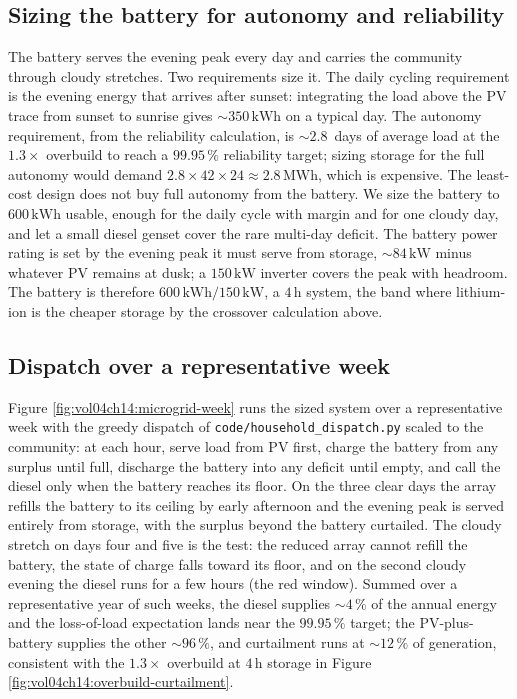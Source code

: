 \subsection{Sizing the battery for autonomy and reliability}

The battery serves the evening peak every day and carries the community
through cloudy stretches. Two requirements size it. The daily cycling
requirement is the evening energy that arrives after sunset: integrating
the load above the PV trace from sunset to sunrise gives $\sim
350\,\si{\kilo\watt\hour}$ on a typical day. The autonomy requirement,
from the reliability calculation, is $\sim 2.8\,$ days of average load at
the $1.3\times$ overbuild to reach a $99.95\,\%$ reliability target;
sizing storage for the full autonomy would demand $2.8\times 42\times 24
\approx 2.8\,\si{\mega\watt\hour}$, which is expensive. The least-cost
design does not buy full autonomy from the battery. We size the battery to
$600\,\si{\kilo\watt\hour}$ usable, enough for the daily cycle with margin
and for one cloudy day, and let a small diesel genset cover the rare
multi-day deficit. The battery power rating is set by the evening peak it
must serve from storage, $\sim 84\,\si{\kilo\watt}$ minus whatever PV
remains at dusk; a $150\,\si{\kilo\watt}$ inverter covers the peak with
headroom. The battery is therefore $600\,\si{\kilo\watt\hour} / 150\,\si{
\kilo\watt}$, a $4\,\si{\hour}$ system, the band where lithium-ion is the
cheaper storage by the crossover calculation above.

\subsection{Dispatch over a representative week}

Figure \ref{fig:vol04ch14:microgrid-week} runs the sized system over a
representative week with the greedy dispatch of
\texttt{code/household\_dispatch.py} scaled to the community: at each hour,
serve load from PV first, charge the battery from any surplus until full,
discharge the battery into any deficit until empty, and call the diesel
only when the battery reaches its floor. On the three clear days the
array refills the battery to its ceiling by early afternoon and the
evening peak is served entirely from storage, with the surplus beyond the
battery curtailed. The cloudy stretch on days four and five is the test:
the reduced array cannot refill the battery, the state of charge falls
toward its floor, and on the second cloudy evening the diesel runs for a
few hours (the red window). Summed over a representative year of such
weeks, the diesel supplies $\sim 4\,\%$ of the annual energy and the
loss-of-load expectation lands near the $99.95\,\%$ target; the PV-plus-
battery supplies the other $\sim 96\,\%$, and curtailment runs at $\sim
12\,\%$ of generation, consistent with the $1.3\times$ overbuild at
$4\,\si{\hour}$ storage in Figure
\ref{fig:vol04ch14:overbuild-curtailment}.

